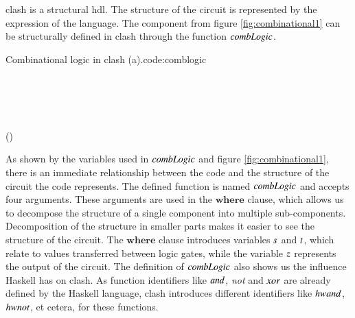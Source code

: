 \gls{clash} is a structural \gls{hdl}.
The structure of the circuit is represented by the expression of the language.
The component from figure \ref{fig:combinational1} can be structurally defined in \gls{clash} through the function \ensuremath{\Varid{combLogic}}.
\begin{texexptitled}{Combinational logic in \gls{clash} (a).}{code:comblogic}\begin{hscode}\SaveRestoreHook
{}%
%
%
%
%
\>[3]{}\;\;\;\;\mathrel{=}\<[E]%
\\
\>[3]{}\<[5]%
\>[5]{}\<[E]%
\\
\>[5]{}\<[9]%
\>[9]{}\mathrel{=}\;\;\<[E]%
\\
\>[5]{}\<[9]%
\>[9]{}\mathrel{=}\;\;\<[E]%
\\
\>[5]{}\<[9]%
\>[9]{}\mathrel{=}\;(\;\;){}\<[E]%
\ColumnHook
\end{hscode}\resethooks
\end{texexptitled}

As shown by the variables used in \ensuremath{\Varid{combLogic}} and figure \ref{fig:combinational1}, there is an immediate relationship between the code and the structure of the circuit the code represents.
The defined function is named \ensuremath{\Varid{combLogic}} and accepts four arguments.
These arguments are used in the \ensuremath{\mathbf{where}} clause, which allows us to decompose the structure of a single component into multiple sub-components.
Decomposition of the structure in smaller parts makes it easier to see the structure of the circuit.
The \ensuremath{\mathbf{where}} clause introduces variables \ensuremath{\Varid{s}} and \ensuremath{\Varid{t}}, which relate to values transferred between logic gates, while the variable \ensuremath{\Varid{z}} represents the output of the circuit.
The definition of \ensuremath{\Varid{combLogic}} also shows us the influence Haskell has on \gls{clash}.
As function identifiers like \ensuremath{\Varid{and}}, \textit{not} and \ensuremath{\Varid{xor}} are already defined by the Haskell language, \gls{clash} introduces different identifiers like \ensuremath{\Varid{hwand}}, \ensuremath{\Varid{hwnot}}, et cetera, for these functions.

